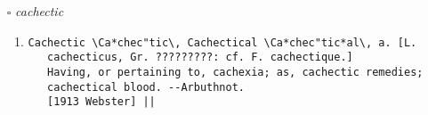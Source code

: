 \documentclass{article}
\begin{document}
\begin{itemize}
\begin{enumerate}
{\begin{lstlisting}
\end{lstlisting}}
\end{enumerate}
\item[$\square$] \emph{ cachectic }
\begin{enumerate}
\item{
\begin{lstlisting}
Cachectic \Ca*chec"tic\, Cachectical \Ca*chec"tic*al\, a. [L.
   cachecticus, Gr. ?????????: cf. F. cachectique.]
   Having, or pertaining to, cachexia; as, cachectic remedies;
   cachectical blood. --Arbuthnot.
   [1913 Webster] ||
\end{lstlisting}}
\end{enumerate}
\end{itemize}
\end{document}
